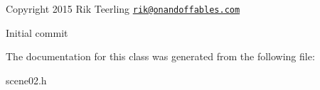 \begin{DoxyItemize}
\item Copyright 2015 Rik Teerling \href{mailto:rik@onandoffables.com}{\tt rik@onandoffables.\+com}
\begin{DoxyItemize}
\item Initial commit 
\end{DoxyItemize}
\end{DoxyItemize}

The documentation for this class was generated from the following file\+:\begin{DoxyCompactItemize}
\item 
scene02.\+h\end{DoxyCompactItemize}

